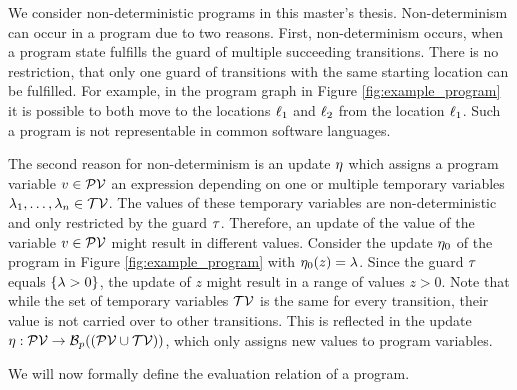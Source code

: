 We consider non-deterministic programs in this master's thesis.
Non-determinism can occur in a program due to two reasons.
First, non-determinism occurs, when a program state fulfills the guard of multiple succeeding transitions. 
There is no restriction, that only one guard of transitions with the same starting location can be fulfilled.
For example, in the program graph in Figure \ref{fig:example_program} it is possible to both move to the locations $\ell_1$ and $\ell_2$ from the location $\ell_1$.
Such a program is not representable in common software languages.

The second reason for non-determinism is an update $\eta$ which assigns a program variable $v \in \mathcal{PV}$ an expression depending on one or multiple temporary variables $\lambda_1, \dots, \lambda_n \in \mathcal{TV}$.
The values of these temporary variables are non-deterministic and only restricted by the guard $\tau$.
Therefore, an update of the value of the variable $v \in \mathcal{PV}$ might result in different values.
Consider the update $\eta_0$ of the program in Figure \ref{fig:example_program} with $\eta_0(z) = \lambda$.
Since the guard $\tau$ equals $\lbrace \lambda > 0 \rbrace$, the update of $z$ might result in a range of values $z > 0$. 
Note that while the set of temporary variables $\mathcal{TV}$ is the same for every transition, their value is not carried over to other transitions.
This is reflected in the update $\eta: \mathcal{PV} \rightarrow \mathcal{B}_p((\mathcal{PV} \cup \mathcal{TV}))$, which only assigns new values to program variables.

We will now formally define the evaluation relation of a program.

